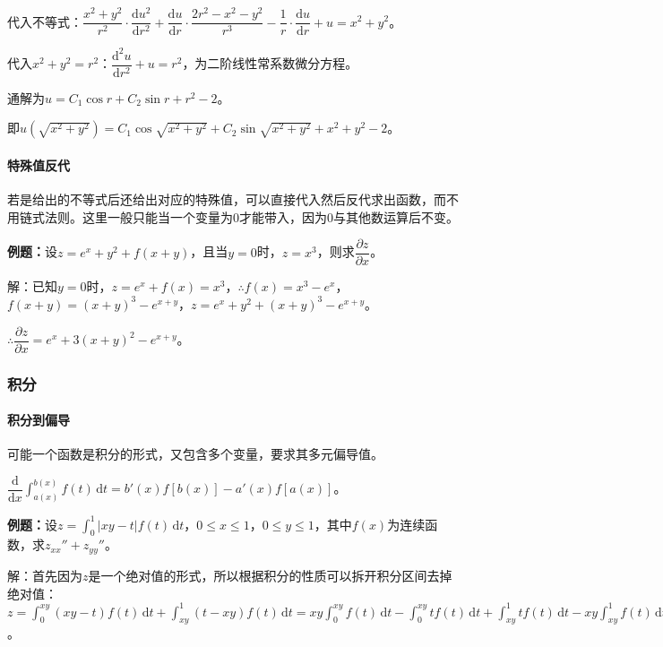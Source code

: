 \documentclass[UTF8, 12pt]{ctexart}
\begin{document}
代入不等式：$\dfrac{x^2+y^2}{r^2}\cdot\dfrac{\textrm{d}u^2}{\textrm{d}r^2}+\dfrac{\textrm{d}u}{\textrm{d}r}\cdot\dfrac{2r^2-x^2-y^2}{r^3}-\dfrac{1}{r}\cdot\dfrac{\textrm{d}u}{\textrm{d}r}+u=x^2+y^2$。

代入$x^2+y^2=r^2$：$\dfrac{\textrm{d}^2u}{\textrm{d}r^2}+u=r^2$，为二阶线性常系数微分方程。

通解为$u=C_1\cos r+C_2\sin r+r^2-2$。

即$u(\sqrt{x^2+y^2})=C_1\cos\sqrt{x^2+y^2}+C_2\sin\sqrt{x^2+y^2}+x^2+y^2-2$。

\paragraph{特殊值反代} \leavevmode \medskip

若是给出的不等式后还给出对应的特殊值，可以直接代入然后反代求出函数，而不用链式法则。这里一般只能当一个变量为0才能带入，因为0与其他数运算后不变。

\textbf{例题：}设$z=e^x+y^2+f(x+y)$，且当$y=0$时，$z=x^3$，则求$\dfrac{\partial z}{\partial x}$。

解：已知$y=0$时，$z=e^x+f(x)=x^3$，$\therefore f(x)=x^3-e^x$，$f(x+y)=(x+y)^3-e^{x+y}$，$z=e^x+y^2+(x+y)^3-e^{x+y}$。

$\therefore\dfrac{\partial z}{\partial x}=e^x+3(x+y)^2-e^{x+y}$。

\subsubsection{积分}

\paragraph{积分到偏导} \leavevmode \medskip

可能一个函数是积分的形式，又包含多个变量，要求其多元偏导值。

$\dfrac{\textrm{d}}{\textrm{d}x}\int_{a(x)}^{b(x)}f(t)\,\textrm{d}t=b'(x)f[b(x)]-a'(x)f[a(x)]$。\medskip

\textbf{例题：}设$z=\int_0^1\vert xy-t\vert f(t)\,\textrm{d}t$，$0\leqslant x\leqslant1$，$0\leqslant y\leqslant1$，其中$f(x)$为连续函数，求$z_{xx}''+z_{yy}''$。

解：首先因为$z$是一个绝对值的形式，所以根据积分的性质可以拆开积分区间去掉绝对值：$z=\int_0^{xy}(xy-t)f(t)\,\textrm{d}t+\int_{xy}^1(t-xy)f(t)\,\textrm{d}t=xy\int_0^{xy}f(t)\,\textrm{d}t-\int_0^{xy}tf(t)\,\textrm{d}t+\int_{xy}^1tf(t)\,\textrm{d}t-xy\int_{xy}^1f(t)\,\textrm{d}t$。
\end{document}
